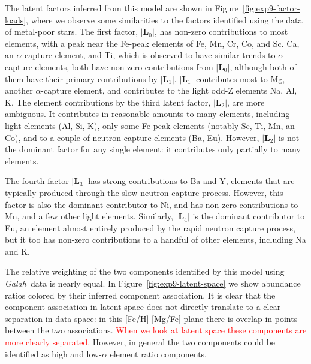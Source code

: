 \documentclass[twocolumn]{aastex62}
\newcommand{\project}[1]{\textsl{#1}}
\newcommand{\Galah}{\project{Galah}}
\newcommand{\todo}[1]{\textcolor{red}{#1}}
\begin{document}
The latent factors inferred from this model are shown in Figure~\ref{fig:exp9-factor-loads},
where we observe some similarities to the factors identified using the \citet{Barklem:2005}
data of metal-poor stars. The first factor, $|\mathbf{L}_0|$, has non-zero contributions
to most elements, with a peak near the Fe-peak elements of Fe, Mn, Cr, Co, and Sc. 
Ca, an $\alpha$-capture element, and Ti, which is observed to have similar trends to
$\alpha$-capture elements, both have non-zero contributions from $|\mathbf{L}_0|$,
although both of them have their primary contributions by $|\mathbf{L}_1|$. $|\mathbf{L}_1|$
contributes most to Mg, another $\alpha$-capture element, and contributes to the light
odd-Z elements Na, Al, K. 
The element contributions by the third latent factor, $|\mathbf{L}_2|$, are more ambiguous.
It contributes in reasonable amounts to many elements, including light elements (Al, Si, K),
only some Fe-peak elements (notably Sc, Ti, Mn, an Co), and to a couple of neutron-capture
elements (Ba, Eu). However, $|\mathbf{L}_2|$ is not the dominant factor for any single element:
it contributes only partially to many elements.

The fourth factor $|\mathbf{L}_3|$ has strong contributions to Ba and Y, elements that are
typically produced through the slow neutron capture process. However, this factor is also
the dominant contributor to Ni, and has non-zero contributions to Mn, and a few other light
elements. Similarly, $|\mathbf{L}_4|$ is the dominant contributor to Eu, an
element almost entirely produced by the rapid neutron capture process, but it too has
non-zero contributions to a handful of other elements, including Na and K.


The relative weighting of the two components identified by this model using
\Galah\ data is nearly equal. In Figure~\ref{fig:exp9-latent-space} we show 
abundance ratios colored by their inferred component association.
It is clear that the component association in latent space does not directly
translate to a clear separation in data space: in this [Fe/H]-[Mg/Fe] plane
there is overlap in points between the two associations. 
\todo{When we look at latent space these components are more clearly separated.}
However, in general
the two components could be identified as high and low-$\alpha$ element ratio
components.
\end{document}
